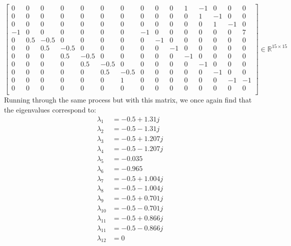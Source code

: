 \documentclass[12pt]{exam}
\begin{document}
\begin{questions}
\begin{solution}
\begin{enumerate}[label=(\alph*)]
\begin{itemize}
\[\begin{bmatrix}
                0 & 0 & 0 & 0 & 0 & 0 & 0 & 0 & 0 & 0 & 1 &-1 & 0 & 0 & 0 \\
                0 & 0 & 0 & 0 & 0 & 0 & 0 & 0 & 0 & 0 & 0 & 1 &-1 & 0 & 0 \\
                0 & 0 & 0 & 0 & 0 & 0 & 0 & 0 & 0 & 0 & 0 & 0 & 1 &-1 & 0 \\
               -1 & 0 & 0 & 0 & 0 & 0 & 0 &-1 & 0 & 0 & 0 & 0 & 0 & 0 & 7 \\
                0 &0.5 &-0.5& 0 & 0 & 0 & 0 & 0 &-1 & 0 & 0 & 0 & 0 & 0 & 0 \\
                0 & 0 &0.5&-0.5& 0 & 0 & 0 & 0 & 0 &-1 & 0 & 0 & 0 & 0 & 0 \\
                0 & 0 & 0 &0.5&-0.5& 0 & 0 & 0 & 0 & 0 &-1 & 0 & 0 & 0 & 0 \\
                0 & 0 & 0 & 0 &0.5&-0.5& 0 & 0 & 0 & 0 & 0 &-1 & 0 & 0 & 0 \\
                0 & 0 & 0 & 0 & 0 &0.5&-0.5& 0 & 0 & 0 & 0 & 0 &-1 & 0 & 0 \\
                0 & 0 & 0 & 0 & 0 & 0 & 1 & 0 & 0 & 0 & 0 & 0 & 0 &-1 &-1 \\
                0 & 0 & 0 & 0 & 0 & 0 & 0 & 0 & 0 & 0 & 0 & 0 & 0 & 0 & 0 \\
              \end{bmatrix} \in \mathbb{R}^{15 \times 15}
          \]
          Running through the same process but with this matrix, we once again find that the eigenvalues correspond to:
          \begin{align*}
            \lambda_1 &= -0.5  + 1.31j \\
            \lambda_2 &= -0.5  - 1.31j  \\
            \lambda_3 &= -0.5  + 1.207j \\
            \lambda_4 &= -0.5  - 1.207j \\ 
            \lambda_5 &= -0.035 \\
            \lambda_6 &= -0.965 \\ 
            \lambda_7 &= -0.5  +1.004j \\
            \lambda_8 &= -0.5  -1.004j \\
            \lambda_9 &= -0.5  +0.701j \\
            \lambda_{10} &= -0.5  -0.701j \\
            \lambda_{11} &= -0.5  +0.866j \\
            \lambda_{11} &= -0.5  -0.866j \\
            \lambda_{12} &= 0

\end{align*}
\end{itemize}
\end{enumerate}
\end{solution}
\end{questions}
\end{document}
